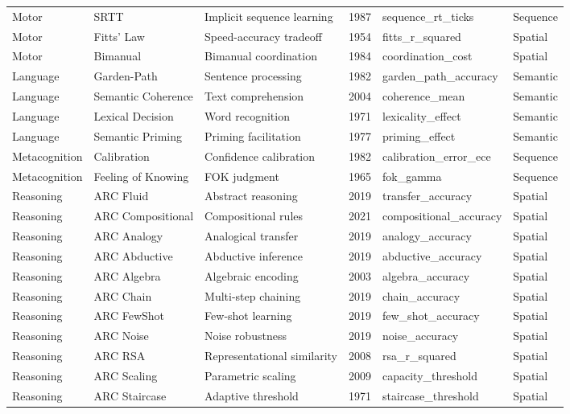 \documentclass[10pt,landscape]{article}
\begin{document}
\begin{longtable}{@{}p{2.3cm}p{3.0cm}p{4.5cm}p{0.6cm}p{3.8cm}p{1.8cm}@{}}
\midrule
Motor & SRTT & Implicit sequence learning \citep{nissen1987attentional} & 1987 & sequence\_rt\_ticks & Sequence \\
Motor & Fitts' Law & Speed-accuracy tradeoff \citep{fitts1954information} & 1954 & fitts\_r\_squared & Spatial \\
Motor & Bimanual & Bimanual coordination & 1984 & coordination\_cost & Spatial \\

\midrule
Language & Garden-Path & Sentence processing \citep{ferreira2002good} & 1982 & garden\_path\_accuracy & Semantic \\
Language & Semantic Coherence & Text comprehension & 2004 & coherence\_mean & Semantic \\
Language & Lexical Decision & Word recognition & 1971 & lexicality\_effect & Semantic \\
Language & Semantic Priming & Priming facilitation & 1977 & priming\_effect & Semantic \\

\midrule
Metacognition & Calibration & Confidence calibration & 1982 & calibration\_error\_ece & Sequence \\
Metacognition & Feeling of Knowing & FOK judgment & 1965 & fok\_gamma & Sequence \\

\midrule
Reasoning & ARC Fluid & Abstract reasoning \citep{chollet2019measure} & 2019 & transfer\_accuracy & Spatial \\
Reasoning & ARC Compositional & Compositional rules & 2021 & compositional\_accuracy & Spatial \\
Reasoning & ARC Analogy & Analogical transfer & 2019 & analogy\_accuracy & Spatial \\
Reasoning & ARC Abductive & Abductive inference & 2019 & abductive\_accuracy & Spatial \\
Reasoning & ARC Algebra & Algebraic encoding & 2003 & algebra\_accuracy & Spatial \\
Reasoning & ARC Chain & Multi-step chaining & 2019 & chain\_accuracy & Spatial \\
Reasoning & ARC FewShot & Few-shot learning & 2019 & few\_shot\_accuracy & Spatial \\
Reasoning & ARC Noise & Noise robustness & 2019 & noise\_accuracy & Spatial \\
Reasoning & ARC RSA & Representational similarity & 2008 & rsa\_r\_squared & Spatial \\
Reasoning & ARC Scaling & Parametric scaling & 2009 & capacity\_threshold & Spatial \\
Reasoning & ARC Staircase & Adaptive threshold & 1971 & staircase\_threshold & Spatial \\


\end{longtable}
\end{document}
